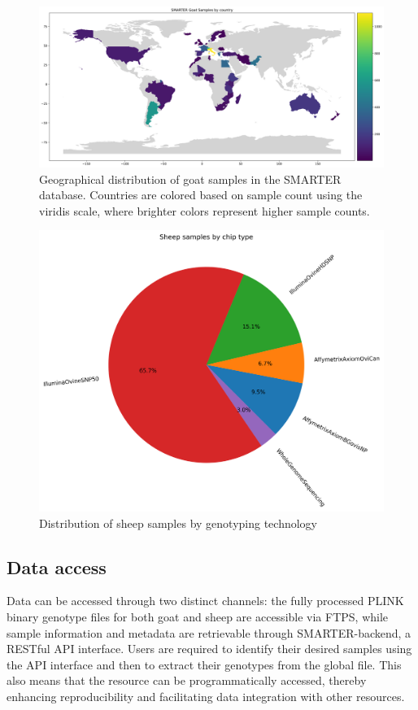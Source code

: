 \documentclass[a4paper,num-refs,gigabyte]{oup-contemporary}
\begin{document}
\begin{figure}
\centering
\includegraphics[width=.95\textwidth]{goat-by-country.png}
\caption{Geographical distribution of goat samples in the SMARTER database. Countries are colored based on sample count using the viridis scale, where brighter colors represent higher sample counts.}
\label{fig:goat_samples}
\end{figure}

\begin{figure}
\centering
\includegraphics[width=.45\textwidth]{sheep-samples-by-chip-type.png}
\caption{Distribution of sheep samples by genotyping technology}
\label{fig:sheep_technology}
\end{figure}

\subsection{Data access}

Data can be accessed through two distinct channels: the fully processed PLINK binary genotype files for both goat and sheep are accessible via FTPS, while sample information and metadata are retrievable through SMARTER-backend\citep{SMARTERAPI}, a RESTful API interface\citep{REST}. Users are required to identify their desired samples using the API interface and then to extract their genotypes from the global file. This also means that the resource can be programmatically accessed, thereby enhancing reproducibility and facilitating data integration with other resources.
\end{document}

